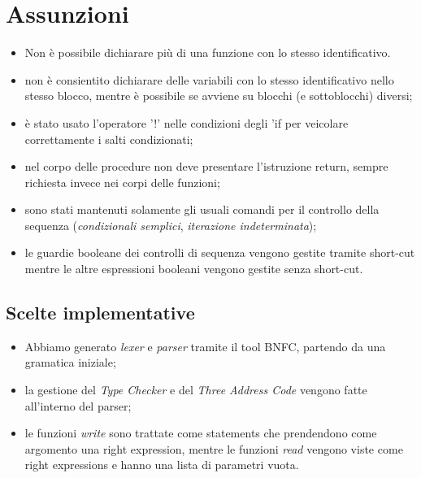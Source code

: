 \documentclass[12pt]{article}
\begin{document}
\begin{center}
\end{center}

\begin{center}
\end{center}

\section*{Assunzioni}
\begin{itemize}
\item Non è possibile dichiarare più di una funzione con lo stesso identificativo.
\item non è consientito dichiarare delle variabili con lo stesso identificativo nello stesso blocco, mentre è possibile se avviene su blocchi (e sottoblocchi) diversi;
\item è stato usato l'operatore '!' nelle condizioni degli 'if per veicolare correttamente i salti condizionati;
\item nel corpo delle procedure non deve presentare l'istruzione return, sempre richiesta invece nei corpi delle funzioni;
\item sono stati mantenuti solamente gli usuali comandi per il controllo della sequenza (\textit{condizionali semplici}, \textit{iterazione indeterminata});
\item le guardie booleane dei controlli di sequenza vengono gestite tramite short-cut mentre le altre espressioni booleani vengono gestite senza short-cut.
\end{itemize}

\subsection*{Scelte implementative}
\begin{itemize}
\item Abbiamo generato \textit{lexer} e \textit{parser} tramite il tool BNFC, partendo da una gramatica iniziale;
\item la gestione del \textit{Type Checker} e del \textit{Three Address Code} vengono fatte all'interno del parser;
\item le funzioni \textit{write} sono trattate come statements che prendendono come argomento una right expression, mentre le funzioni \textit{read} vengono viste come right expressions e hanno una lista di parametri vuota.
\end{itemize}
\end{document}
